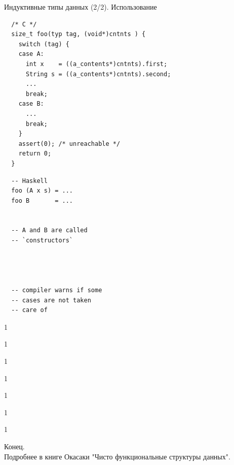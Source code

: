 \documentclass[aspectratio=169
  , xcolor={svgnames}
  , hyperref={ colorlinks,citecolor=DeepPink4
             , linkcolor=DarkRed,urlcolor=DarkBlue}
  , russian
  ]{beamer}
\theoremstyle{exerciseStyle1}
\begin{document}
\begin{frame}[fragile]{Индуктивные типы данных (2/2). Использование}


\begin{minipage}{.65\textwidth}
  \begin{verbatim}
  /* C */
  size_t foo(typ tag, (void*)cntnts ) {
    switch (tag) {
    case A: 
      int x    = ((a_contents*)cntnts).first;
      String s = ((a_contents*)cntnts).second;
      ...
      break;
    case B:
      ...
      break;
    }    
    assert(0); /* unreachable */
    return 0;
  }
  \end{verbatim}
\end{minipage}
\begin{minipage}{.3\textwidth}
  \begin{verbatim}
  -- Haskell
  foo (A x s) = ...
  foo B       = ...


  -- A and B are called 
  -- `constructors`
  
  
  
  
  -- compiler warns if some
  -- cases are not taken
  -- care of
  \end{verbatim}
\end{minipage}
\end{frame}

\begin{frame}[fragile]{}
1
\end{frame}

\begin{frame}[fragile]{}
1
\end{frame}

\begin{frame}[fragile]{}
1
\end{frame}

\begin{frame}[fragile]{}
1
\end{frame}

\begin{frame}[fragile]{}
1
\end{frame}

\begin{frame}[fragile]{}
1
\end{frame}

\begin{frame}[fragile]{}
1
\end{frame}

%
%
%
%
%


\begin{frame}
\begin{center}
  {\Huge Конец.}\\
  
  Подробнее в книге Окасаки "Чисто функциональные структуры данных".
\end{center}
\end{frame}
\end{document}
